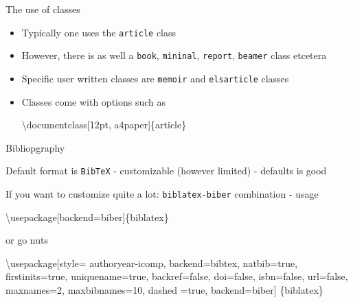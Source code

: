 \documentclass[ignorenonframetext,]{beamer}
\newenvironment{Shaded}{\begin{snugshade}}{\end{snugshade}}
\newcommand{\NormalTok}[1]{{#1}}
\begin{document}
\begin{frame}[fragile]{The use of classes}

\begin{itemize}
\item
  Typically one uses the \texttt{article} class
\item
  However, there is as well a \texttt{book}, \texttt{mininal},
  \texttt{report}, \texttt{beamer} class etcetera
\item
  Specific user written classes are \texttt{memoir} and
  \texttt{elsarticle} classes
\item
  Classes come with options such as

\begin{Shaded}
\begin{Highlighting}[]
\NormalTok{\textbackslash{}documentclass[12pt, a4paper]\{article\}}
\end{Highlighting}
\end{Shaded}
\end{itemize}

\end{frame}

\begin{frame}[fragile]{Bibliopgraphy}

Default format is \texttt{BibTeX} - customizable (however limited) -
defaults is good

If you want to customize quite a lot: \texttt{biblatex-biber}
combination - usage

\begin{Shaded}
\begin{Highlighting}[]
    \NormalTok{\textbackslash{}usepackage[backend=biber]\{biblatex\}}
\end{Highlighting}
\end{Shaded}

\end{frame}

\begin{frame}[fragile]{or go nuts}

\begin{Shaded}
\begin{Highlighting}[]
\NormalTok{\textbackslash{}usepackage[style= authoryear-icomp, }
            \NormalTok{backend=bibtex,}
            \NormalTok{natbib=true, }
            \NormalTok{firstinits=true, }
            \NormalTok{uniquename=true,}
            \NormalTok{backref=false,}
            \NormalTok{doi=false,}
            \NormalTok{isbn=false,}
            \NormalTok{url=false,}
            \NormalTok{maxnames=2, }
            \NormalTok{maxbibnames=10, }
            \NormalTok{dashed =true, }
            \NormalTok{backend=biber]}
\NormalTok{            \{biblatex\}}
\end{Highlighting}
\end{Shaded}

\end{frame}
\end{document}
